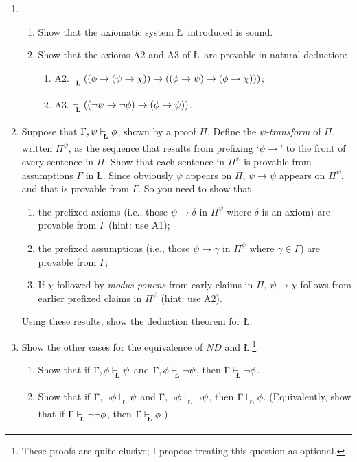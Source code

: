 {\begin{enumerate}
\begin{enumerate}
	\item  the full Natural Deduction system is complete for \lone\ with respect to the intended semantics.
\end{enumerate}  
\item \begin{enumerate}
	\item Show that the axiomatic system \L\ introduced is sound.
	\item Show that the axioms A2 and A3 of \L\ are provable in natural deduction: \begin{enumerate}
		\item A2. $\lvdash ((\phi \to (\psi \to \chi)) \to ((\phi \to \psi) \to (\phi \to \chi)))$;
		\item A3. $\lvdash ((\neg \psi \to \neg \phi) \to (\phi \to \psi))$.
	\end{enumerate}
\end{enumerate}
\item Suppose that $\Gamma,\psi\lvdash\phi$, shown by a proof $\Pi$. Define the \emph{$\psi$-transform} of $\Pi$, written $\Pi^{\psi}$, as the sequence that results from prefixing `$\psi\to$' to the front of every sentence in $\Pi$. Show that each sentence in $\Pi^{\psi}$ is provable from assumptions $\Gamma$ in \L. Since obviously $\psi$ appears on $\Pi$, $\psi\to\psi$ appears on $\Pi^{\psi}$, and that is provable from $\Gamma$. So you need to show that \begin{enumerate}
		\item the prefixed axioms (i.e., those $\psi\to\delta$ in $\Pi^{\psi}$ where $\delta$ is an axiom) are provable from $\Gamma$ (hint: use A1);
		\item the prefixed assumptions (i.e., those $\psi\to\gamma$ in $\Pi^{\psi}$ where $\gamma \in\Gamma$) are provable from $\Gamma$;
		\item If $\chi$ followed by \emph{modus ponens} from early claims in $\Pi$, $\psi\to\chi$ follows from earlier prefixed claims in $\Pi^{\psi}$ (hint: use A2).
	\end{enumerate}
 Using these results, show the deduction theorem for \L.
\item Show the other cases for the equivalence of $ND$ and \L:\footnote{These proofs are quite elusive; I propose treating this question as optional.}  \begin{enumerate}
	\item Show that if $\Gamma,\phi\lvdash\psi$ and $\Gamma,\phi\lvdash\neg\psi$, then $\Gamma\lvdash \neg\phi$.
	\item Show that if $\Gamma,\neg\phi\lvdash\psi$ and $\Gamma,\neg\phi\lvdash\neg\psi$, then $\Gamma\lvdash \phi$. (Equivalently, show that if $\Gamma\lvdash\neg\neg\phi$, then $\Gamma\lvdash\phi$.)

\end{enumerate}
\end{enumerate}}
